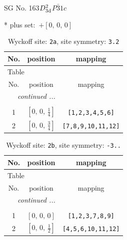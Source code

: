 \documentclass[fleqn,8pt]{jsarticle}
\begin{document}
\setcounter{MaxMatrixCols}{32}

\renewcommand{\tablename}{Table~}
\renewcommand{\figurename}{Figure~}
\begin{center}
\LARGE
SG No. 163\quad$D_{\rm 3d}^{2}$\quad$P\bar{3}1c$\quad[ trigonal ]
\end{center}
* plus set:\,\,\,$+\left[ 0,\, 0,\, 0 \right]$
\renewcommand{\arraystretch}{1.2}
\begin{longtable}{ccc}
\caption{Wyckoff site: {\tt 2a}, site symmetry: {\tt 3.2}}
 \\
 \hline \hline
No. & position & mapping \\ \hline \endfirsthead

\multicolumn{2}{l}{\tablename\ \thetable{}} \\
 \hline \hline
No. & position & mapping \\ \hline \endhead

 \hline \hline
\multicolumn{2}{r}{\footnotesize\it continued ...} \\ \endfoot

 \hline \hline
\multicolumn{2}{r}{} \\ \endlastfoot

1 & $\left[ 0,\, 0,\, \frac{1}{4} \right]$ & {\tt [1,2,3,4,5,6]} \\ \hline
2 & $\left[ 0,\, 0,\, \frac{3}{4} \right]$ & {\tt [7,8,9,10,11,12]} \\
\end{longtable}
\renewcommand{\arraystretch}{1.2}
\begin{longtable}{ccc}
\caption{Wyckoff site: {\tt 2b}, site symmetry: {\tt -3..}}
 \\
 \hline \hline
No. & position & mapping \\ \hline \endfirsthead

\multicolumn{2}{l}{\tablename\ \thetable{}} \\
 \hline \hline
No. & position & mapping \\ \hline \endhead

 \hline \hline
\multicolumn{2}{r}{\footnotesize\it continued ...} \\ \endfoot

 \hline \hline
\multicolumn{2}{r}{} \\ \endlastfoot

1 & $\left[ 0,\, 0,\, 0 \right]$ & {\tt [1,2,3,7,8,9]} \\ \hline
2 & $\left[ 0,\, 0,\, \frac{1}{2} \right]$ & {\tt [4,5,6,10,11,12]} \\
\end{longtable}
\end{document}
